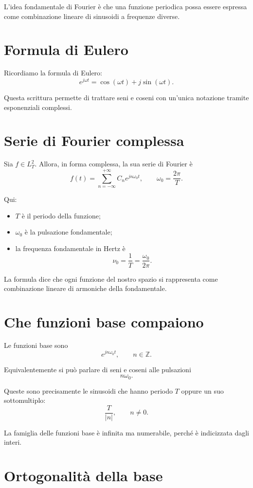 L'idea fondamentale di Fourier è che una funzione periodica possa essere espressa
come combinazione lineare di sinusoidi a frequenze diverse.

\section{Formula di Eulero}

Ricordiamo la formula di Eulero:
\[
e^{j\omega t}=\cos(\omega t)+j\sin(\omega t).
\]

Questa scrittura permette di trattare seni e coseni con un'unica notazione
tramite esponenziali complessi.

\section{Serie di Fourier complessa}

Sia \(f\in L_T^2\). Allora, in forma complessa, la sua serie di Fourier è
\[
f(t)=\sum_{n=-\infty}^{+\infty} C_n e^{j n\omega_0 t},
\qquad
\omega_0=\frac{2\pi}{T}.
\]

Qui:
\begin{itemize}
    \item \(T\) è il periodo della funzione;
    \item \(\omega_0\) è la pulsazione fondamentale;
    \item la frequenza fondamentale in Hertz è
    \[
    \nu_0=\frac{1}{T}=\frac{\omega_0}{2\pi}.
    \]
\end{itemize}

La formula dice che ogni funzione del nostro spazio si rappresenta come combinazione lineare
di armoniche della fondamentale.

\section{Che funzioni base compaiono}

Le funzioni base sono
\[
e^{j n\omega_0 t},
\qquad n\in\mathbb{Z}.
\]

Equivalentemente si può parlare di seni e coseni alle pulsazioni
\[
n\omega_0.
\]

Queste sono precisamente le sinusoidi che hanno periodo \(T\) oppure un suo sottomultiplo:
\[
\frac{T}{|n|}, \qquad n\neq 0.
\]

La famiglia delle funzioni base è infinita ma numerabile,
perché è indicizzata dagli interi.

\section{Ortogonalità della base}

